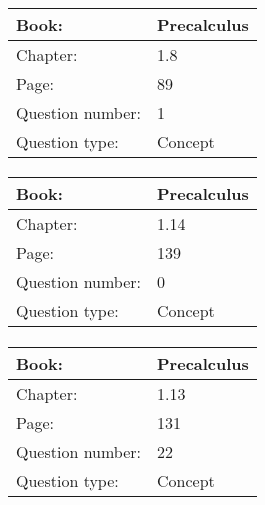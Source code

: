 \documentclass{article}
\begin{document}
            \paragraph{}
            \begin{tabularx}{1\textwidth}{
                    p{}
                    p{}
                }
                \toprule
                Book: & Precalculus
                \\
                \midrule
                Chapter: & 1.8
                \\
                \midrule
                Page: & 89
                \\
                \midrule
                Question number: & 1
                \\
                \midrule
                Question type: & Concept
                \\
                \bottomrule
            \end{tabularx}
            
            \paragraph{}
            \begin{tabularx}{1\textwidth}{
                    p{}
                    p{}
                }
                \toprule
                Book: & Precalculus
                \\
                \midrule
                Chapter: & 1.14
                \\
                \midrule
                Page: & 139
                \\
                \midrule
                Question number: & 0
                \\
                \midrule
                Question type: & Concept
                \\
                \bottomrule
            \end{tabularx}
            
            \paragraph{}
            \begin{tabularx}{1\textwidth}{
                    p{}
                    p{}
                }
                \toprule
                Book: & Precalculus
                \\
                \midrule
                Chapter: & 1.13
                \\
                \midrule
                Page: & 131
                \\
                \midrule
                Question number: & 22
                \\
                \midrule
                Question type: & Concept
                \\
                \bottomrule
            \end{tabularx}
            
\end{document}
